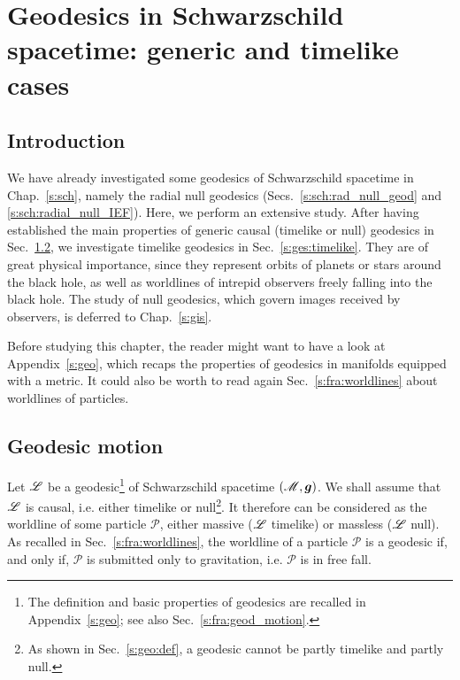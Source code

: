 \chapter{Geodesics in Schwarzschild spacetime: generic and timelike cases}
\label{s:ges}

\minitoc

\section{Introduction}

We have already investigated some geodesics of Schwarzschild spacetime in
Chap.~\ref{s:sch}, namely
the radial null geodesics (Secs.~\ref{s:sch:rad_null_geod} and \ref{s:sch:radial_null_IEF}).
Here, we perform an extensive study.
After having established the main properties of generic causal (timelike or null) geodesics
in Sec.~\ref{s:ges:geod_motion}, we investigate timelike
geodesics in Sec.~\ref{s:ges:timelike}. They
are of great physical importance, since they represent
orbits of planets or stars around the black hole, as well as worldlines of
intrepid observers freely falling into the black hole.
The study of null geodesics, which govern images received by observers,
is deferred to Chap.~\ref{s:gis}.

Before studying this chapter, the reader might want to have a look at
Appendix~\ref{s:geo}, which recaps the properties of geodesics in
manifolds equipped with a metric.
It could also be worth to read again Sec.~\ref{s:fra:worldlines} about
worldlines of particles.

\section{Geodesic motion} \label{s:ges:geod_motion}

Let $\mathscr{L}$ be a geodesic\footnote{The definition and basic properties of geodesics
are recalled in Appendix~\ref{s:geo}; see also Sec.~\ref{s:fra:geod_motion}.} of Schwarzschild spacetime
$(\mathscr{M},\bm{g})$. We shall assume that $\mathscr{L}$ is causal, i.e. either timelike or null\footnote{As
shown in Sec.~\ref{s:geo:def}, a geodesic cannot be partly timelike and partly
null.}. It therefore can be considered as the worldline
of some particle $\mathscr{P}$, either massive
($\mathscr{L}$ timelike) or massless ($\mathscr{L}$ null). As recalled in Sec.~\ref{s:fra:worldlines},
the worldline of a particle $\mathscr{P}$ is a geodesic if, and only if,
$\mathscr{P}$ is submitted only to gravitation, i.e.
$\mathscr{P}$ is in free fall.


